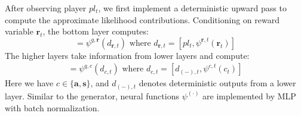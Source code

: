 \documentclass{article}
\newcommand{\context}{c}
\newcommand{\state}{\mathbf{s}}
\newcommand{\action}{\mathbf{a}}
\newcommand{\reward}{\boldsymbol{r}}
\newcommand{\player}{pl}
\begin{document}
After observing player $\player_{t}$, 
we first implement a deterministic upward pass to compute the approximate likelihood contributions. Conditioning on reward variable $\reward_{t}$, the bottom layer computes:
\begin{equation}
    [\boldsymbol{\hat{\mu}}^{q}_{\reward,t},\boldsymbol{\hat{\sigma}}^{q}_{\reward,t}]=\psi^{q,\reward}(d_{\reward,t}) \text{ where } d_{\reward,t}=[\player_{t}, \psi^{\reward,t}(\reward_{t})]
\end{equation}
The higher layers take information from lower layers and compute:
\begin{align}
    [\boldsymbol{\hat{\mu}}^{q}_{\context,t},\boldsymbol{\hat{\sigma}}^{q}_{\context,t}]=\psi^{q,\context}(d_{\context,t}) \text{ where } d_{\context,t}=[d_{(-),t}, \psi^{\context,t}(\context_{t})]
\end{align}
Here we have $\context\in\{\action,\state\}$, and $d_{(-),t}$ denotes deterministic outputs from a lower layer. Similar to the generator, neural functions $\psi^{(\cdot)}$ are implemented by MLP with batch normalization. 
\end{document}
